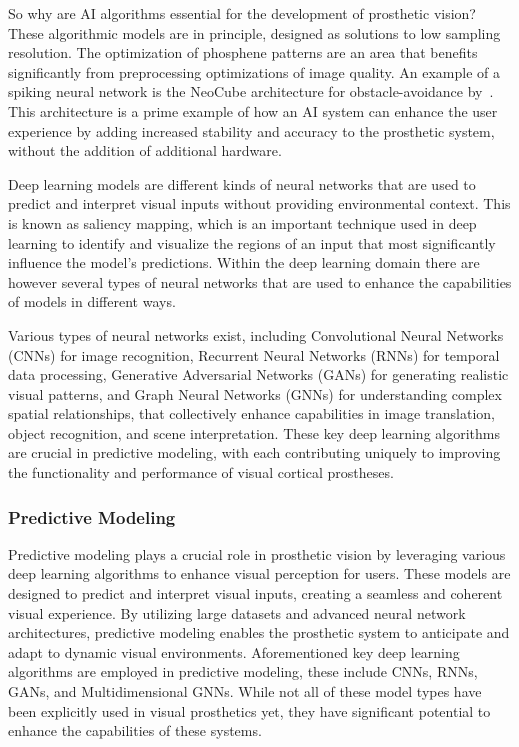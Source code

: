 \documentclass[twocolumn,10pt]{article}
\begin{document}
So why are AI algorithms essential for the development of prosthetic vision?
These algorithmic models are in principle, designed as solutions to low sampling
resolution. The optimization of phosphene patterns are an area that benefits
significantly from preprocessing optimizations of image quality. An example of a
spiking neural network is the NeoCube architecture for obstacle-avoidance
by~\textcite{guoOptimizationVisualInformation2018}. This architecture is a prime
example of how an AI system can enhance the user experience by adding increased
stability and accuracy to the prosthetic system, without the addition of
additional hardware.

Deep learning models are different kinds of neural networks that are used to
predict and interpret visual inputs without providing environmental context.
This is known as saliency mapping, which is an important technique used in deep
learning to identify and visualize the regions of an input that most
significantly influence the model's predictions. Within the deep learning domain
there are however several types of neural networks that are used to enhance the
capabilities of models in different ways.

Various types of neural networks exist, including Convolutional Neural Networks
(CNNs) for image recognition, Recurrent Neural Networks (RNNs) for temporal data
processing, Generative Adversarial Networks (GANs) for generating realistic
visual patterns, and Graph Neural Networks (GNNs) for understanding complex
spatial relationships, that collectively enhance capabilities in image
translation, object recognition, and scene interpretation. These key deep
learning algorithms are crucial in predictive modeling, with each contributing
uniquely to improving the functionality and performance of visual cortical
prostheses.


\subsubsection*{Predictive Modeling}
Predictive modeling plays a crucial role in prosthetic vision by leveraging
various deep learning algorithms to enhance visual perception for users. These
models are designed to predict and interpret visual inputs, creating a seamless
and coherent visual experience. By utilizing large datasets and advanced neural
network architectures, predictive modeling enables the prosthetic system to
anticipate and adapt to dynamic visual environments. Aforementioned key deep
learning algorithms are employed in predictive modeling, these include CNNs,
RNNs, GANs, and Multidimensional GNNs. While not all of these model types have
been explicitly used in visual prosthetics yet, they have significant potential
to enhance the capabilities of these systems.
\end{document}
